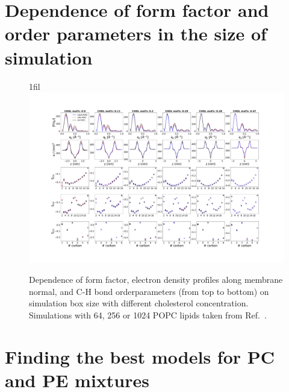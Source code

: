 \documentclass[fleqn,10pt]{wlscirep}
\makeatletter
\newcommand*{\centerfloat}{%
  \parindent \z@
  \leftskip \z@ \@plus 1fil \@minus \textwidth
  \rightskip\leftskip
  \parfillskip \z@skip}
\makeatother
\begin{document}
\pagebreak
\section{Dependence of form factor and order parameters in the size of simulation}

\begin{figure}[!h]
    \centerfloat
    \includegraphics[width = 240mm]{Figures/SizeDependence.pdf}
    \caption{Dependence of form factor, electron density profiles along membrane normal, and C-H bond orderparameters (from top to bottom) on simulation box size with different cholesterol concentration. Simulations with 64, 256 or 1024 POPC lipids taken from Ref.~. }
    \label{fig:sizedependence}
\end{figure}


\pagebreak
\section{Finding the best models for PC and PE mixtures}
\end{document}

